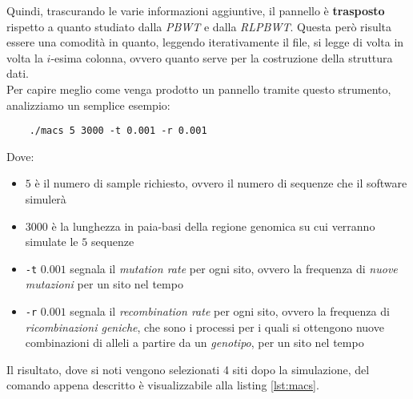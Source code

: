 Quindi, trascurando le varie informazioni aggiuntive, il pannello è
\textbf{trasposto} rispetto a quanto studiato dalla \textit{PBWT} e dalla
\textit{RLPBWT}. Questa però risulta essere una comodità in quanto, leggendo
iterativamente il file, si legge di volta in volta la $i$-esima colonna, ovvero
quanto serve per la costruzione della struttura dati.\\
Per capire meglio come venga prodotto un pannello tramite questo strumento,
analizziamo un semplice esempio:
\begin{shaded}
  \begin{verbatim}
    ./macs 5 3000 -t 0.001 -r 0.001
  \end{verbatim}
\end{shaded}
\noindent
Dove:
\begin{itemize}
  \item $5$ è il numero di sample richiesto, ovvero il numero di sequenze che
  il software simulerà
  \item $3000$ è la lunghezza in paia-basi della regione genomica su cui
  verranno simulate le $5$ sequenze
  \item \texttt{-t} $0.001$ segnala il \textit{mutation rate} per ogni sito,
  ovvero la frequenza di \textit{nuove mutazioni} per un sito nel tempo 
  \item \texttt{-r} $0.001$ segnala il \textit{recombination rate} per ogni
  sito, ovvero la frequenza di \textit{ricombinazioni geniche}, che sono i
  processi per i quali si ottengono nuove combinazioni di alleli a partire da un
  \textit{genotipo}, per un sito nel tempo 
\end{itemize}
Il risultato, dove si noti vengono selezionati 4 siti dopo la simulazione, del
comando appena descritto è visualizzabile alla listing \ref{lst:macs}.\\ 

